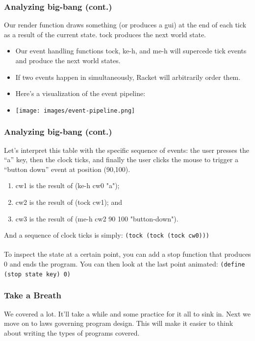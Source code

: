 \documentclass{beamer}
\begin{document}
\begin{frame}
  \frametitle{Analyzing big-bang (cont.)}
  Our render function draws something (or produces a gui)
  at the end of each tick as a result of the current state. tock
  produces the next world state.
  \begin{itemize}
  \item<2-> Our event handling functions tock, ke-h, and me-h will supercede tick events and produce the next world states.
  \item<3-> If two events happen in simultaneously, Racket will arbitrarily order them.
  \item<4-> Here's a visualization of the event pipeline:
  \item<5-> \texttt{[image: images/event-pipeline.png]}
  \end{itemize}
\end{frame}


\begin{frame}
  \frametitle{Analyzing big-bang (cont.)}
  Let’s interpret this table with the specific sequence of events: the user presses the “a” key, then the clock ticks, and finally the user clicks the mouse to trigger a “button down” event at position (90,100).
  \begin{enumerate}
  \item<2-> cw1 is the result of (ke-h cw0 "a");
  \item<3-> cw2 is the result of (tock cw1); and
  \item<4-> cw3 is the result of (me-h cw2 90 100 "button-down").
  \end{enumerate}
  \pause
  And a sequence of clock ticks is simply:
  \texttt{(tock (tock (tock cw0)))}
  \pause
  \\\\
  To inspect the state at a certain point, you can add a stop function that
  produces 0 and ends the program. You can then look at the last point animated:
  \texttt{(define (stop state key) 0)}
\end{frame}

\begin{frame}
  \frametitle{Take a Breath}
  \huge We covered a lot. It'll take a while and some practice  for it all to sink in. Next we move on to laws governing program design. This will make it easier
  to think about writing the types of programs covered.
\end{frame}
\end{document}
